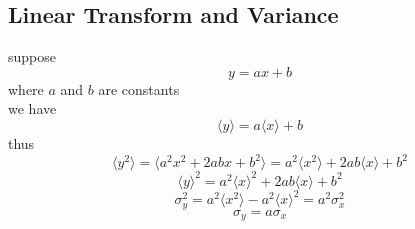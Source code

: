 \documentclass[UTF8]{ctexart} %
\numberwithin{equation}{subsection}
\begin{document}
\subsection{Linear Transform and Variance}
suppose
\begin{equation}\label{key}
y=ax+b
\end{equation}
where $a$ and $b$ are constants\\
we have
\begin{equation}\label{key}
\langle y\rangle=a\langle x\rangle+b
\end{equation}
thus
\begin{equation}\label{key}
\langle y^2\rangle=\langle a^2 x^2 + 2abx + b^2\rangle=a^2\langle x^2\rangle+2ab\langle x\rangle+b^2
\end{equation}
\begin{equation}\label{key}
\langle y\rangle^2=a^2\langle x\rangle^2+2ab\langle x\rangle+b^2
\end{equation}
\begin{equation}\label{key}
\sigma_y^2=a^2\langle x^2\rangle-a^2\langle x\rangle^2=a^2\sigma_x^2
\end{equation}
\begin{equation}\label{key}
\sigma_y=a\sigma_x
\end{equation}
\end{document}
